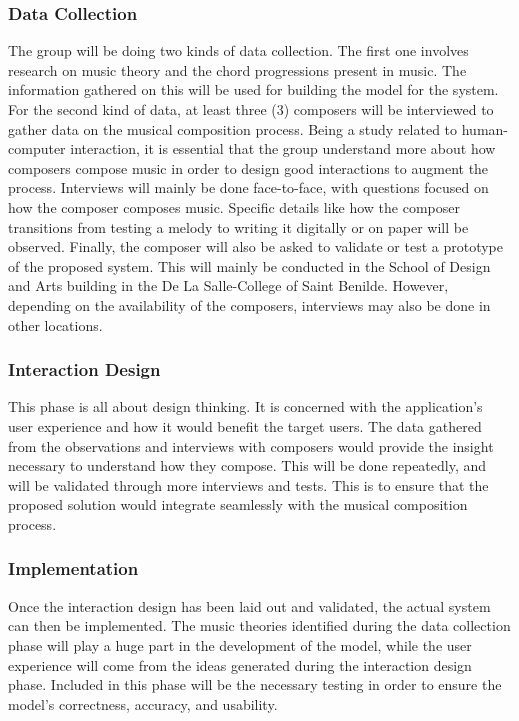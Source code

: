 \subsubsection{Data Collection}
The group will be doing two kinds of data collection. The first one involves research on music theory and the chord progressions present in music. The information gathered on this will be used for building the model for the system. For the second kind of data, at least three (3) composers will be interviewed to gather data on the musical composition process. Being a study related to human-computer interaction, it is essential that the group understand more about how composers compose music in order to design good interactions to augment the process. Interviews will mainly be done face-to-face, with questions focused on how the composer composes music. Specific details like how the composer transitions from testing a melody to writing it digitally or on paper will be observed. Finally, the composer will also be asked to validate or test a prototype of the proposed system. This will mainly be conducted in the School of Design and Arts building in the De La Salle-College of Saint Benilde. However, depending on the availability of the composers, interviews may also be done in other locations. 

\subsubsection{Interaction Design}
This phase is all about design thinking. It is concerned with the application's user experience and how it would benefit the target users. The data gathered from the observations and interviews with composers would provide the insight necessary to understand how they compose. This will be done repeatedly, and will be validated through more interviews and tests. This is to ensure that the proposed solution would integrate seamlessly with the musical composition process.


\subsubsection{Implementation}
Once the interaction design has been laid out and validated, the actual system can then be implemented. The music theories identified during the data collection phase will play a huge part in the development of the model, while the user experience will come from the ideas generated during the interaction design phase. Included in this phase will be the necessary testing in order to ensure the model's correctness, accuracy, and usability.


